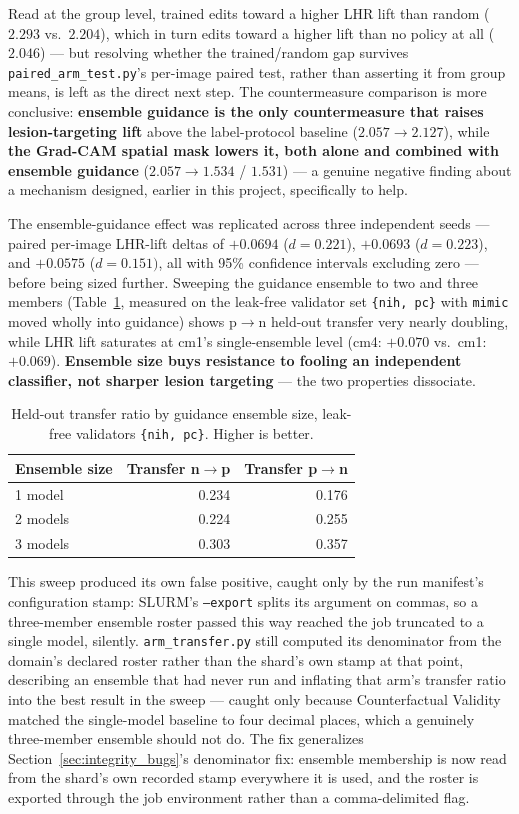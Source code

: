 \documentclass[11pt]{article}
\begin{document}
Read at the group level, trained edits toward a higher LHR lift than
random ($2.293$ vs.\ $2.204$), which in turn edits toward a higher lift
than no policy at all ($2.046$) — but resolving whether the trained/random
gap survives \texttt{paired\_arm\_test.py}'s per-image paired test, rather
than asserting it from group means, is left as the direct next step. The
countermeasure comparison is more conclusive: \textbf{ensemble guidance is
the only countermeasure that raises lesion-targeting lift} above the
label-protocol baseline ($2.057 \to 2.127$), while \textbf{the Grad-CAM
spatial mask lowers it, both alone and combined with ensemble guidance}
($2.057 \to 1.534$ / $1.531$) — a genuine negative finding about a
mechanism designed, earlier in this project, specifically to help.

The ensemble-guidance effect was replicated across three independent
seeds — paired per-image LHR-lift deltas of $+0.0694$ ($d=0.221$),
$+0.0693$ ($d=0.223$), and $+0.0575$ ($d=0.151)$, all with 95\% confidence
intervals excluding zero — before being sized further. Sweeping the
guidance ensemble to two and three members (Table~\ref{tab:ensemble_sweep},
measured on the leak-free validator set \texttt{\{nih, pc\}} with
\texttt{mimic} moved wholly into guidance) shows p$\to$n held-out transfer
very nearly doubling, while LHR lift saturates at cm1's single-ensemble
level (cm4: $+0.070$ vs.\ cm1: $+0.069$). \textbf{Ensemble size buys
resistance to fooling an independent classifier, not sharper lesion
targeting} — the two properties dissociate.

\begin{table}[h]
\centering
\caption{Held-out transfer ratio by guidance ensemble size, leak-free
validators \texttt{\{nih, pc\}}. Higher is better.}
\label{tab:ensemble_sweep}
\begin{tabular}{@{}lrr@{}}
\toprule
\textbf{Ensemble size} & \textbf{Transfer n$\to$p} & \textbf{Transfer p$\to$n} \\
\midrule
1 model  & 0.234 & 0.176 \\
2 models & 0.224 & 0.255 \\
3 models & 0.303 & 0.357 \\
\bottomrule
\end{tabular}
\end{table}

This sweep produced its own false positive, caught only by the run
manifest's configuration stamp: SLURM's \texttt{--export} splits its
argument on commas, so a three-member ensemble roster passed this way
reached the job truncated to a single model, silently. \texttt{arm\_transfer.py}
still computed its denominator from the domain's declared roster rather
than the shard's own stamp at that point, describing an ensemble that had
never run and inflating that arm's transfer ratio into the best result in
the sweep — caught only because Counterfactual Validity matched the
single-model baseline to four decimal places, which a genuinely
three-member ensemble should not do. The fix generalizes
Section~\ref{sec:integrity_bugs}'s denominator fix: ensemble membership is
now read from the shard's own recorded stamp everywhere it is used, and
the roster is exported through the job environment rather than a
comma-delimited flag.
\end{document}

